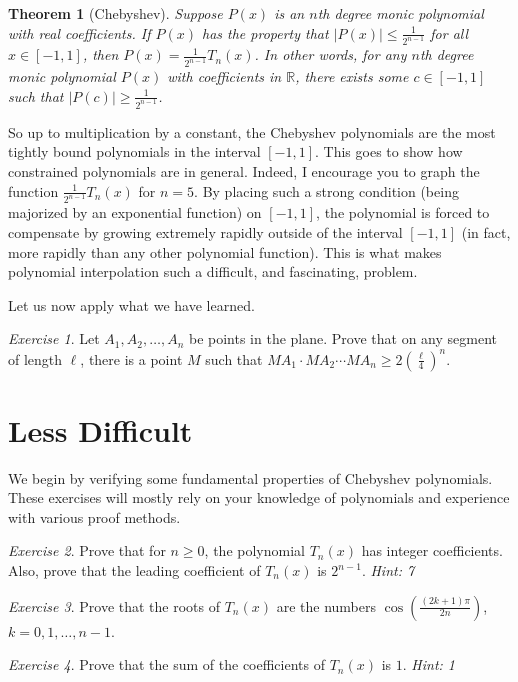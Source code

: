 \documentclass{article}
\newtheorem{theorem}{Theorem}[section]
\theoremstyle{definition}
\theoremstyle{remark}
\newtheorem{exercise}{Exercise}
\newcommand{\RR}{\mathbb{R}}
\newcommand{\geqs}{\geqslant}
\newcommand{\leqs}{\leqslant}
\begin{document}
\begin{theorem}[Chebyshev]
Suppose $P(x)$ is an $n$th degree monic polynomial with real coefficients. If $P(x)$ has the property that $|P(x)|\leqs \frac{1}{2^{n-1}}$ for all $x\in [-1,1]$, then $P(x)=\frac{1}{2^{n-1}}T_n(x)$. In other words, for any $n$th degree monic polynomial $P(x)$ with coefficients in $\RR$, there exists some $c\in [-1,1]$ such that $|P(c)|\geqs \frac{1}{2^{n-1}}$.
\end{theorem}

So up to multiplication by a constant, the Chebyshev polynomials are the most tightly bound polynomials in the interval $[-1,1]$. This goes to show how constrained polynomials are in general. Indeed, I encourage you to graph the function $\frac{1}{2^{n-1}}T_n(x)$ for $n=5$. By placing such a strong condition (being majorized by an exponential function) on $[-1,1]$, the polynomial is forced to compensate by growing extremely rapidly outside of the interval $[-1,1]$ (in fact, more rapidly than any other polynomial function). This is what makes polynomial interpolation such a difficult, and fascinating, problem.

Let us now apply what we have learned.
\begin{exercise}
Let $A_1,A_2,\dots,A_n$ be points in the plane. Prove that on any segment of length $\ell$, there is a point $M$ such that $MA_1\cdot MA_2\cdots MA_n\geqs 2\left(\frac{\ell}{4}\right)^n$.
\end{exercise}

\section{Less Difficult}
We begin by verifying some fundamental properties of Chebyshev polynomials. These exercises will mostly rely on your knowledge of polynomials and experience with various proof methods.

\begin{exercise}
Prove that for $n\geqs 0$, the polynomial $T_n(x)$ has integer coefficients. Also, prove that the leading coefficient of $T_n(x)$ is $2^{n-1}$. \emph{Hint: 7}
\end{exercise}

\begin{exercise}
Prove that the roots of $T_n(x)$ are the numbers $\cos\left(\frac{(2k+1)\pi}{2n}\right)$, $k=0,1,\dots, n-1$. 
\end{exercise}

\begin{exercise}
Prove that the sum of the coefficients of $T_n(x)$ is $1$. \emph{Hint: 1}
\end{exercise}
\end{document}
